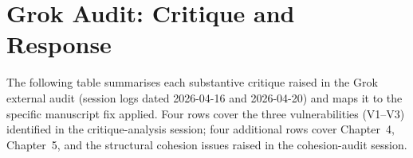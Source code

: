 \documentclass[12pt]{article}
\begin{document}
\appendix
\section{Grok Audit: Critique and Response}
\label{app:grok}

The following table summarises each substantive critique raised in the
Grok external audit (session logs dated 2026-04-16 and 2026-04-20)
and maps it to the specific manuscript fix applied.  Four rows cover
the three vulnerabilities (V1--V3) identified in the critique-analysis
session; four additional rows cover Chapter~4, Chapter~5, and the
structural cohesion issues raised in the cohesion-audit session.

\bigskip
\end{document}
